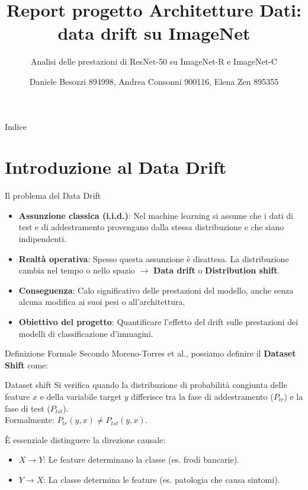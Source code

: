 \documentclass[aspectratio=169]{beamer}
\title[Data Drift su ImageNet]{Report progetto Architetture Dati: data drift su ImageNet}
\subtitle{Analisi delle prestazioni di ResNet-50 su ImageNet-R e ImageNet-C}
\author[Besozzi, Consonni, Zen]{Daniele Besozzi 894998, Andrea Consonni 900116, Elena Zen 895355}
\institute{Progetto Architetture Dati}
\date{}
\begin{document}
\begin{frame}
  \titlepage
\end{frame}

\begin{frame}{Indice}
  \tableofcontents[hideallsubsections]
\end{frame}

\section{Introduzione al Data Drift}

\begin{frame}{Il problema del Data Drift}
    \begin{itemize}
        \item \textbf{Assunzione classica (i.i.d.)}: Nel machine learning si assume che i dati di test e di addestramento provengano dalla stessa distribuzione e che siano indipendenti.
        \item \textbf{Realtà operativa}: Spesso questa assunzione è disattesa. La distribuzione cambia nel tempo o nello spazio $\rightarrow$ \textbf{Data drift} o \textbf{Distribution shift}.
        \item \textbf{Conseguenza}: Calo significativo delle prestazioni del modello, anche senza alcuna modifica ai suoi pesi o all'architettura.
        \item \textbf{Obiettivo del progetto}: Quantificare l'effetto del drift sulle prestazioni dei modelli di classificazione d'immagini.
    \end{itemize}
\end{frame}

\begin{frame}{Definizione Formale}
    Secondo Moreno-Torres et al., possiamo definire il \textbf{Dataset Shift} come:
    \vspace{0.3cm}
    \begin{block}{Dataset shift}
        Si verifica quando la distribuzione di probabilità congiunta delle feature $x$ e della variabile target $y$ differisce tra la fase di addestramento ($P_{tr}$) e la fase di test ($P_{tst}$).\\
        Formalmente: $P_{tr}(y,x) \neq P_{tst}(y,x)$.
    \end{block}
    \vspace{0.3cm}
    È essenziale distinguere la direzione causale:
    \begin{itemize}
        \item $X \rightarrow Y$: Le feature determinano la classe (es. frodi bancarie).
        \item $Y \rightarrow X$: La classe determina le feature (es. patologia che causa sintomi).
    \end{itemize}
\end{frame}
\end{document}
